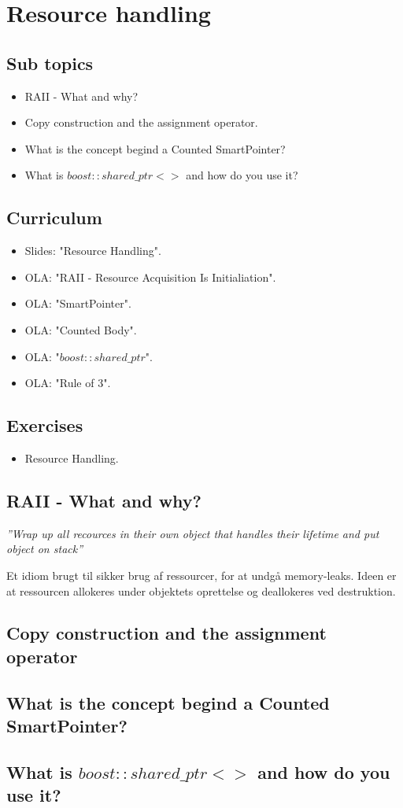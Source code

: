 \section{Resource handling}

\subsection{Sub topics}

\begin{itemize}
	\item RAII - What and why?
	\item Copy construction and the assignment operator.
	\item What is the concept begind a Counted SmartPointer?
	\item What is $boost::shared\_ptr<>$ and how do you use it?
\end{itemize}

\subsection{Curriculum}

\begin{itemize}
	\item Slides: "Resource Handling".
	\item OLA: "RAII - Resource Acquisition Is Initialiation".
	\item OLA: "SmartPointer".
	\item OLA: "Counted Body".
	\item OLA: "$boost::shared\_ptr$".
	\item OLA: "Rule of 3".
\end{itemize}

\subsection{Exercises}

\begin{itemize}
	\item Resource Handling.
\end{itemize}

\subsection{RAII - What and why?}\label{sec:raii}
\textit{''Wrap up all recources in their own object that handles their lifetime and put object on stack''}

Et idiom brugt til sikker brug af ressourcer, for at undgå memory-leaks. Ideen er at ressourcen allokeres under objektets oprettelse og deallokeres ved destruktion.

\subsection{Copy construction and the assignment operator}

\subsection{What is the concept begind a Counted SmartPointer?}

\subsection{What is $boost::shared\_ptr<>$ and how do you use it?}
